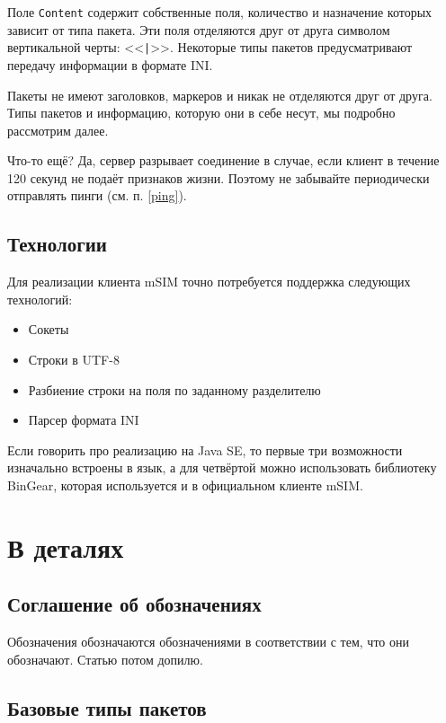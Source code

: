 \documentclass[a4paper,12pt]{book}
\begin{document}
Поле \texttt{Content} содержит собственные поля, количество и назначение которых зависит от типа пакета. Эти поля отделяются друг от друга символом вертикальной черты: <<\texttt{|}>>. Некоторые типы пакетов предусматривают передачу информации в формате INI.

Пакеты не имеют заголовков, маркеров и никак не отделяются друг от друга. Типы пакетов и информацию, которую они в себе несут, мы подробно рассмотрим далее.

Что-то ещё? Да, сервер разрывает соединение в случае, если клиент в течение 120 секунд не подаёт признаков жизни. Поэтому не забывайте периодически отправлять пинги (см. п. \ref{ping}).

\section{Технологии}

Для реализации клиента mSIM точно потребуется поддержка следующих технологий:

\begin{itemize}
	
\item Сокеты
\item Строки в UTF-8
\item Разбиение строки на поля по заданному разделителю
\item Парсер формата INI
	
\end{itemize}

Если говорить про реализацию на Java SE, то первые три возможности изначально встроены в язык, а для четвёртой можно использовать библиотеку BinGear, которая используется и в официальном клиенте mSIM.

\chapter{В деталях}

\section{Соглашение об обозначениях}

Обозначения обозначаются обозначениями в соответствии с тем, что они обозначают. Статью потом допилю.

\section{Базовые типы пакетов}
\end{document}

